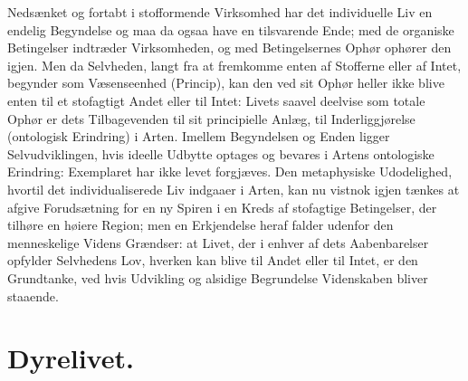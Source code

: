 \documentclass[11pt]{book}
\begin{document}
Nedsænket og fortabt i stofformende Virksomhed har det individuelle
Liv en endelig Begyndelse og maa da ogsaa have en tilsvarende Ende;
med de organiske Betingelser indtræder Virksomheden, og med
Betingelsernes Ophør ophører den igjen. Men da Selvheden, langt fra at
fremkomme enten af Stofferne eller af Intet, begynder som
Væsenseenhed (Princip), kan den ved sit Ophør heller ikke blive enten
til et stofagtigt Andet eller til Intet: Livets saavel deelvise som
totale Ophør er dets Tilbagevenden til sit principielle Anlæg, til
Inderliggjørelse (ontologisk Erindring) i Arten. Imellem Begyndelsen
og Enden ligger Selvudviklingen, hvis ideelle Udbytte optages og
bevares i Artens ontologiske Erindring: Exemplaret har ikke levet
forgjæves. Den metaphysiske Udodelighed, hvortil det individualiserede
Liv indgaaer i Arten, kan nu vistnok igjen tænkes at afgive
Forudsætning for en ny Spiren i en Kreds af stofagtige Betingelser,
der tilhøre en høiere Region; men en Erkjendelse heraf falder udenfor
den menneskelige Videns Grændser: at Livet, der i enhver af dets
Aabenbarelser opfylder Selvhedens Lov, hverken kan blive til Andet
eller til Intet, er den Grundtanke, ved hvis Udvikling og alsidige
Begrundelse Videnskaben bliver staaende.

\chapter*{Dyrelivet.}
\end{document}

